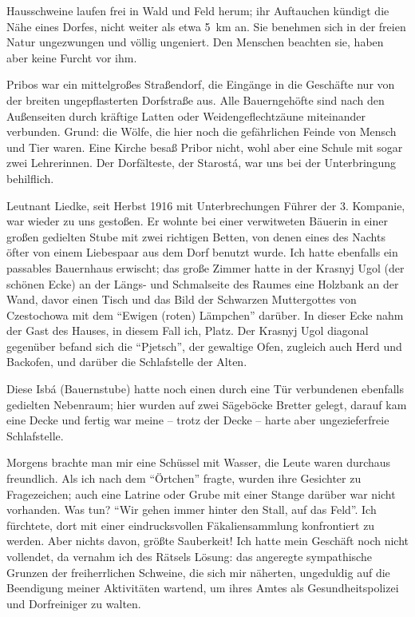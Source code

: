 Hausschweine laufen frei in Wald und Feld herum; ihr Auftauchen kündigt die Nähe eines Dorfes, nicht weiter als etwa 5~km an. Sie benehmen sich in der freien Natur ungezwungen und völlig ungeniert. Den Menschen beachten sie, haben aber keine Furcht vor ihm.

Pribos war ein mittelgroßes Straßendorf, die Eingänge in die Geschäfte nur von der breiten ungepflasterten Dorfstraße aus. Alle Bauerngehöfte sind nach den Außenseiten durch kräftige Latten oder Weidengeflechtzäune miteinander verbunden. Grund: die Wölfe, die hier noch die gefährlichen Feinde von Mensch und Tier waren. Eine Kirche besaß Pribor nicht, wohl aber eine Schule mit sogar zwei Lehrerinnen. Der Dorfälteste, der Starostá, war uns bei der Unterbringung behilflich.

Leutnant Liedke, seit Herbst 1916 mit Unterbrechungen Führer der 3. Kompanie, war wieder zu uns gestoßen. Er wohnte bei einer verwitweten Bäuerin in einer großen gedielten Stube mit zwei richtigen Betten, von denen eines des Nachts öfter von einem Liebespaar aus dem Dorf benutzt wurde. Ich hatte ebenfalls ein passables Bauernhaus erwischt; das große Zimmer hatte in der Krasnyj Ugol (der schönen Ecke) an der Längs- und Schmalseite des Raumes eine Holzbank an der Wand, davor einen Tisch und das Bild der Schwarzen Muttergottes von Czestochowa mit dem \enquote{Ewigen (roten) Lämpchen} darüber. In dieser Ecke nahm der Gast des Hauses, in diesem Fall ich, Platz. Der Krasnyj Ugol diagonal gegenüber befand sich die \enquote{Pjetsch}, der gewaltige Ofen, zugleich auch Herd und Backofen, und darüber die Schlafstelle der Alten.

Diese Isbá (Bauernstube) hatte noch einen durch eine Tür verbundenen ebenfalls gedielten Nebenraum; hier wurden auf zwei Sägeböcke Bretter gelegt, darauf kam eine Decke und fertig war meine -- trotz der Decke -- harte aber ungezieferfreie Schlafstelle.

Morgens brachte man mir eine Schüssel mit Wasser, die Leute waren durchaus freundlich. Als ich nach dem \enquote{Örtchen} fragte, wurden ihre Gesichter zu Fragezeichen; auch eine Latrine oder Grube mit einer Stange darüber war nicht vorhanden. Was tun? \enquote{Wir gehen immer hinter den Stall, auf das Feld}. Ich fürchtete, dort mit einer eindrucksvollen Fäkaliensammlung konfrontiert zu werden. Aber nichts davon, größte Sauberkeit! Ich hatte mein Geschäft noch nicht vollendet, da vernahm ich des Rätsels Lösung: das angeregte sympathische Grunzen der freiherrlichen Schweine, die sich mir näherten, ungeduldig auf die Beendigung meiner Aktivitäten wartend, um ihres Amtes als Gesundheitspolizei und Dorfreiniger zu walten.

